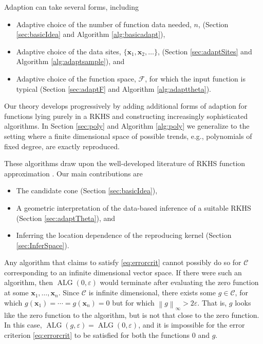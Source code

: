 \documentclass[]{mcom-l}
\theoremstyle{remark}
\DeclareMathOperator{\ALG}{ALG}
\newcommand{\bx}{{\boldsymbol{x}}}
\newcommand{\cc}{\mathcal{C}}
\newcommand{\calf}{{\mathcal{F}}}
\newcommand{\norm}[2][{}]{\ensuremath{\left \lVert #2 \right \rVert}_{#1}}
\begin{document}
Adaption can take several forms, including
\begin{itemize}
    \item Adaptive choice of the number of function data needed, $n$, (Section \ref{sec:basicIdea} and Algorithm \ref{alg:basicadapt}),
    \item Adaptive choice of the data sites, $\{\bx_1, \bx_2, \ldots\}$,  (Section \ref{sec:adaptSites} and Algorithm \ref{alg:adaptsample}), and
    \item Adaptive choice of the function space, $\calf$, for which the input function is typical  (Section \ref{sec:adaptF} and Algorithm \ref{alg:adapttheta}).
\end{itemize}
Our theory develops progressively by adding additional forms of adaption for functions lying purely in a RKHS and constructing increasingly sophisticated algorithms.  In Section \ref{sec:poly} and Algorithm \ref{alg:poly} we generalize to the setting where a finite dimensional space of possible trends, e.g., polynomials of fixed degree, are exactly reproduced.

These algorithms draw upon the well-developed literature of RKHS function approximation \cite{Buh03a,Fas07a,FasMcC15a,ForFly15a,ForEtal09,RasWil06a,SchWen06a,Wah85a,Wen05a}.  Our main contributions are 
\begin{itemize}
	\item The candidate cone (Section \ref{sec:basicIdea}),
	\item A geometric interpretation of the data-based inference of a suitable RKHS (Section  \ref{sec:adaptTheta}), and
	\item Inferring the location dependence of the reproducing kernel (Section \ref{sec:InferSpace}).
\end{itemize}

Any algorithm that claims to satisfy \eqref{eq:errorcrit} cannot possibly do so for $\cc$ corresponding to an infinite dimensional vector space.  If there were such an algorithm, then $\ALG(0,\varepsilon)$ would terminate after evaluating the zero function at some $\bx_1, \ldots, \bx_n$.  Since $\cc$ is infinite dimensional, there exists some $g \in \cc$, for which $g(\bx_1) = \cdots = g(\bx_n) = 0$ but for which $\norm[\infty]{g} > 2 \varepsilon$.  That is, $g$ looks like the zero function to the algorithm, but is not that close to the zero function.  In this case, $\ALG(g,\varepsilon) = \ALG(0,\varepsilon)$, and it is impossible for the error criterion \eqref{eq:errorcrit} to be satisfied for both the functions $0$ and $g$.
\end{document}
